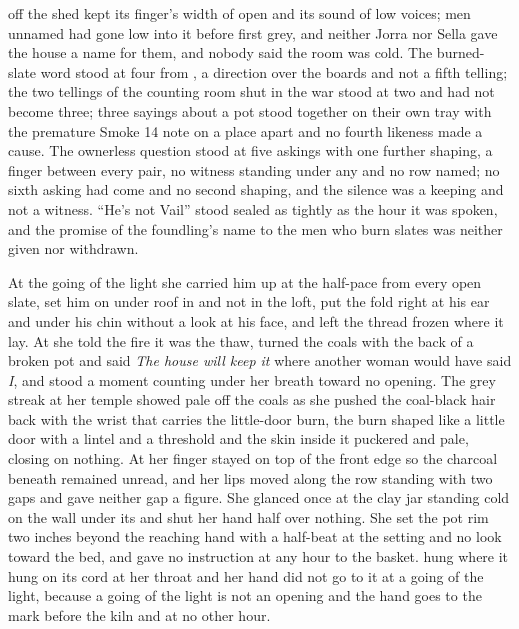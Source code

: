  off the shed kept its finger's width of open and its sound of low voices; men unnamed had gone low into it before first grey, and neither Jorra nor Sella gave the house a name for them, and nobody said the room was cold. The burned-slate word stood at four from , a direction over the boards and not a fifth telling; the two tellings of the counting room shut in the war stood at two and had not become three; three sayings about a pot stood together on their own tray with the premature Smoke 14 note on a place apart and no fourth likeness made a cause. The ownerless question stood at five askings with one further shaping, a finger between every pair, no witness standing under any and no row named; no sixth asking had come and no second shaping, and the silence was a keeping and not a witness. “He's not Vail” stood sealed as tightly as the hour it was spoken, and the promise of the foundling's name to the men who burn slates was neither given nor withdrawn.

\scenebreak

At the going of the light she carried him up at the half-pace from every open slate, set him on  under  roof in  and not in the loft, put the fold right at his ear and under his chin without a look at his face, and left the thread frozen where it lay. At  she told the fire it was the thaw, turned the coals with the back of a broken pot and said \emph{The house will keep it} where another woman would have said \emph{I}, and stood a moment counting under her breath toward no opening. The grey streak at her temple showed pale off the coals as she pushed the coal-black hair back with the wrist that carries the little-door burn, the burn shaped like a little door with a lintel and a threshold and the skin inside it puckered and pale, closing on nothing. At  her finger stayed on top of the front edge so the charcoal beneath remained unread, and her lips moved along the row standing with two gaps and gave neither gap a figure. She glanced once at the clay jar standing cold on the wall under its  and shut her hand half over nothing. She set the pot rim two inches beyond the reaching hand with a half-beat at the setting and no look toward the bed, and gave no instruction at any hour to the basket.  hung where it hung on its cord at her throat and her hand did not go to it at a going of the light, because a going of the light is not an opening and the hand goes to the mark before the kiln and at no other hour.

